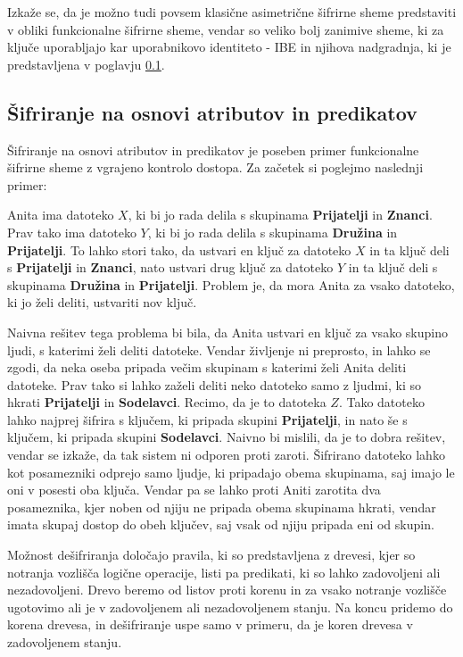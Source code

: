 \documentclass[12pt,a4paper,openany,tikz]{book}
\theoremstyle{plain}
\theoremstyle{definition}
\begin{document}
Izkaže se, da je možno tudi povsem klasične asimetrične šifrirne sheme predstaviti v obliki funkcionalne šifrirne sheme, vendar so veliko bolj zanimive sheme, ki za ključe uporabljajo kar uporabnikovo identiteto - \gls{IBE} in njihova nadgradnja, ki je predstavljena v poglavju \ref{sub:Sifriranje na osnovi atributov in predikatov}.

\subsection{Šifriranje na osnovi atributov in predikatov}
\label{sub:Sifriranje na osnovi atributov in predikatov}

Šifriranje na osnovi atributov in predikatov je poseben primer funkcionalne šifrirne sheme z vgrajeno kontrolo dostopa. Za začetek si poglejmo naslednji primer:

Anita ima datoteko $X$, ki bi jo rada delila s skupinama \textbf{Prijatelji} in \textbf{Znanci}. Prav tako ima datoteko $Y$, ki bi jo rada delila s skupinama \textbf{Družina} in \textbf{Prijatelji}. To lahko stori tako, da ustvari en ključ za datoteko $X$ in ta ključ deli s \textbf{Prijatelji} in  \textbf{Znanci}, nato ustvari drug ključ za datoteko $Y$ in ta ključ deli s skupinama \textbf{Družina} in \textbf{Prijatelji}. Problem je, da mora Anita za vsako datoteko, ki jo želi deliti, ustvariti nov ključ.

Naivna rešitev tega problema bi bila, da Anita ustvari en ključ za vsako skupino ljudi, s katerimi želi deliti datoteke. Vendar življenje ni preprosto, in lahko se zgodi, da neka oseba pripada večim skupinam s katerimi želi Anita deliti datoteke. Prav tako si lahko zaželi deliti neko datoteko samo z ljudmi, ki so hkrati \textbf{Prijatelji} in \textbf{Sodelavci}. Recimo, da je to datoteka $Z$. Tako datoteko lahko najprej šifrira s ključem, ki pripada skupini \textbf{Prijatelji}, in nato še s ključem, ki pripada skupini \textbf{Sodelavci}. Naivno bi mislili, da je to dobra rešitev, vendar se izkaže, da tak sistem ni odporen proti zaroti. Šifrirano datoteko lahko kot posamezniki odprejo samo ljudje, ki pripadajo obema skupinama, saj imajo le oni v posesti oba ključa. Vendar pa se lahko proti Aniti zarotita dva posameznika, kjer noben od njiju ne pripada obema skupinama hkrati, vendar imata skupaj dostop do obeh ključev, saj vsak od njiju pripada eni od skupin.

Možnost dešifriranja določajo pravila, ki so predstavljena z drevesi, kjer so notranja vozlišča logične operacije, listi pa predikati, ki so lahko zadovoljeni ali nezadovoljeni. Drevo beremo od listov proti korenu in za vsako notranje vozlišče ugotovimo ali je v zadovoljenem ali nezadovoljenem stanju. Na koncu pridemo do korena drevesa, in dešifriranje uspe samo v primeru, da je koren drevesa v zadovoljenem stanju.
\end{document}
